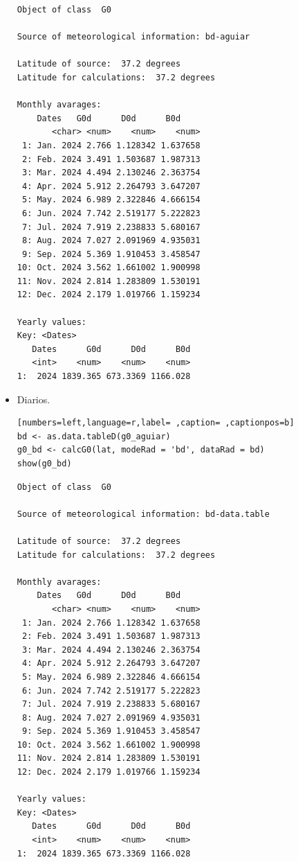 \begin{itemize}
\begin{verbatim}
Object of class  G0 

Source of meteorological information: bd-aguiar 

Latitude of source:  37.2 degrees
Latitude for calculations:  37.2 degrees

Monthly avarages:
	Dates   G0d      D0d      B0d
       <char> <num>    <num>    <num>
 1: Jan. 2024 2.766 1.128342 1.637658
 2: Feb. 2024 3.491 1.503687 1.987313
 3: Mar. 2024 4.494 2.130246 2.363754
 4: Apr. 2024 5.912 2.264793 3.647207
 5: May. 2024 6.989 2.322846 4.666154
 6: Jun. 2024 7.742 2.519177 5.222823
 7: Jul. 2024 7.919 2.238833 5.680167
 8: Aug. 2024 7.027 2.091969 4.935031
 9: Sep. 2024 5.369 1.910453 3.458547
10: Oct. 2024 3.562 1.661002 1.900998
11: Nov. 2024 2.814 1.283809 1.530191
12: Dec. 2024 2.179 1.019766 1.159234

Yearly values:
Key: <Dates>
   Dates      G0d      D0d      B0d
   <int>    <num>    <num>    <num>
1:  2024 1839.365 673.3369 1166.028
\end{verbatim}

\item Diarios.
\begin{lstlisting}[numbers=left,language=r,label= ,caption= ,captionpos=b]
bd <- as.data.tableD(g0_aguiar)
g0_bd <- calcG0(lat, modeRad = 'bd', dataRad = bd)
show(g0_bd)
\end{lstlisting}

\begin{verbatim}
Object of class  G0 

Source of meteorological information: bd-data.table 

Latitude of source:  37.2 degrees
Latitude for calculations:  37.2 degrees

Monthly avarages:
	Dates   G0d      D0d      B0d
       <char> <num>    <num>    <num>
 1: Jan. 2024 2.766 1.128342 1.637658
 2: Feb. 2024 3.491 1.503687 1.987313
 3: Mar. 2024 4.494 2.130246 2.363754
 4: Apr. 2024 5.912 2.264793 3.647207
 5: May. 2024 6.989 2.322846 4.666154
 6: Jun. 2024 7.742 2.519177 5.222823
 7: Jul. 2024 7.919 2.238833 5.680167
 8: Aug. 2024 7.027 2.091969 4.935031
 9: Sep. 2024 5.369 1.910453 3.458547
10: Oct. 2024 3.562 1.661002 1.900998
11: Nov. 2024 2.814 1.283809 1.530191
12: Dec. 2024 2.179 1.019766 1.159234

Yearly values:
Key: <Dates>
   Dates      G0d      D0d      B0d
   <int>    <num>    <num>    <num>
1:  2024 1839.365 673.3369 1166.028
\end{verbatim}


\end{itemize}
